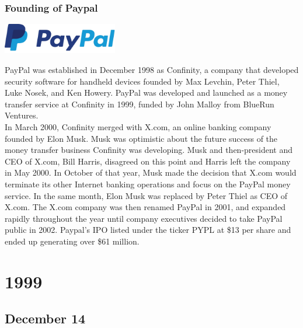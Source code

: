 \documentclass[11pt]{report}
\begin{document}
\subsection{Founding of Paypal}
\vspace{2mm}\begin{center}\includegraphics[width=5cm]{./img/paypalLogo.jpg}\end{center}
PayPal was established in December 1998 as Confinity, a company that developed security software for handheld devices founded by Max Levchin, Peter Thiel, Luke Nosek, and Ken Howery. PayPal was developed and launched as a money transfer service at Confinity in 1999, funded by John Malloy from BlueRun Ventures.\\ \indent In March 2000, Confinity merged with X.com, an online banking company founded by Elon Musk. Musk was optimistic about the future success of the money transfer business Confinity was developing. Musk and then-president and CEO of X.com, Bill Harris, disagreed on this point and Harris left the company in May 2000. In October of that year, Musk made the decision that X.com would terminate its other Internet banking operations and focus on the PayPal money service. In the same month, Elon Musk was replaced by Peter Thiel as CEO of X.com. The X.com company was then renamed PayPal in 2001, and expanded rapidly throughout the year until company executives decided to take PayPal public in 2002. Paypal's IPO listed under the ticker PYPL at \$13 per share and ended up generating over \$61 million.

\chapter{1999}
\section{December 14}
\end{document}
